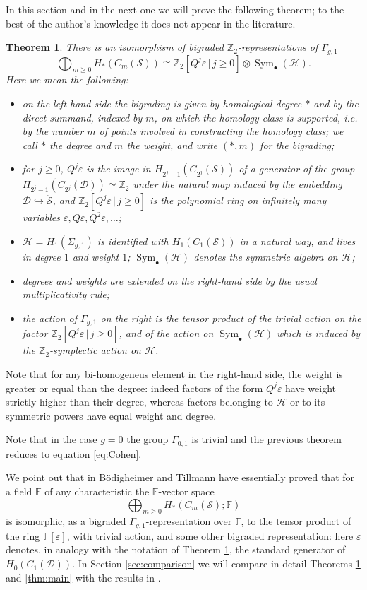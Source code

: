 \documentclass{amsart}
\theoremstyle{plain}
\newtheorem{thm}{Theorem}[section]
\theoremstyle{definition}
\newcommand{\D}{\mathcal{D}}
\renewcommand{\H}{\mathcal{H}}
\renewcommand{\S}{\mathcal{S}}
\newcommand{\Z}{\mathbb{Z}}
\newcommand{\sg}{\Sigma_{g,1}}
\renewcommand{\gg}{\Gamma_{g,1}}
\newcommand{\cms}{C_m(\S)}
\newcommand{\pa}[1]{\left(#1\right)}
\newcommand{\mrS}{\mathring{\S}}
\renewcommand{\epsilon}{\varepsilon}
\DeclareMathOperator{\Sym}{Sym}
\begin{document}
In this section and in the next one we will prove the following theorem; to the best of the author's knowledge
it does not appear in the literature.
\begin{thm}
 \label{thm:Hbms*as*ggrep}
 There is an isomorphism of bigraded $\Z_2$-representations of $\gg$
 \[
  \bigoplus_{m\geq 0} H_*\pa{\cms}\cong \Z_2\left[Q^j\epsilon\,|\, j\geq 0\right]\otimes\Sym_{\bullet}(\H).
 \]
 Here we mean the following:
 \begin{itemize}
  \item[(i)] on the left-hand side the bigrading is given by homological degree $*$ and by the direct summand,
  indexed by $m$,
  on which the homology class is supported, i.e. by the number $m$ of points
  involved in constructing the homology class; we call $*$ the \emph{degree} and $m$ the \emph{weight},
  and write $(*,m)$ for the bigrading;
  \item[(ii)] for $j\geq 0$, $Q^j\epsilon$ is the image in $H_{2^j-1}(C_{2^j}(\S))$ of a generator
  of the group $H_{2^j-1}(C_{2^j}(\D))\simeq \Z_2$ 
  under the natural map induced by the embedding $\D\hookrightarrow\mrS$,
  and $\Z_2\left[Q^j\epsilon\,|\, j\geq 0\right]$ is the polynomial ring on
  infinitely many variables $\epsilon,Q\epsilon,Q^2\epsilon,\dots$;
  \item[(iii)] $\H=H_1(\sg)$ is identified with $H_1(C_1(\S))$ in a natural way, and lives in degree $1$ and weight $1$;
  $\Sym_{\bullet}(\H)$ denotes the symmetric algebra on $\H$;
  \item[(iv)] degrees and weights are extended on the right-hand side by the usual multiplicativity rule;
  \item[(v)] the action of $\gg$ on the right is the tensor product of the trivial action
  on the factor $\Z_2[Q^j\epsilon\,|\, j\geq 0]$, and of the action on
  $\Sym_{\bullet}(\H)$ which is induced by the $\Z_2$-symplectic action on $\H$.
  \end{itemize}
\end{thm}
Note that for any bi-homogeneus element in the right-hand side, the weight is greater or equal than
the degree: indeed factors of the form $Q^j\epsilon$ have weight strictly higher than their degree,
whereas factors belonging to $\H$ or to its symmetric powers have equal weight and degree.
  
Note that in the case $g=0$ the group $\Gamma_{0,1}$ is trivial and the previous theorem
reduces to equation \eqref{eq:Cohen}.

We point out that in \cite{BoT} B\"{o}digheimer and Tillmann have essentially proved that for a field
$\mathbb{F}$ of any characteristic the $\mathbb{F}$-vector space
\[
  \bigoplus_{m\geq 0} H_*\pa{\cms;\mathbb{F}}
\]
is isomorphic, as a bigraded $\gg$-representation over $\mathbb{F}$, to the tensor product
of the ring $\mathbb{F}[\epsilon]$, with trivial action, and some other bigraded representation:
here $\epsilon$ denotes, in analogy with the notation of Theorem \ref{thm:Hbms*as*ggrep}, the standard generator of $H_0(C_1(\D))$.
In Section \ref{sec:comparison} we will compare in detail Theorems \ref{thm:Hbms*as*ggrep}
and \ref{thm:main} with the results in \cite{BoT}.
\end{document}

